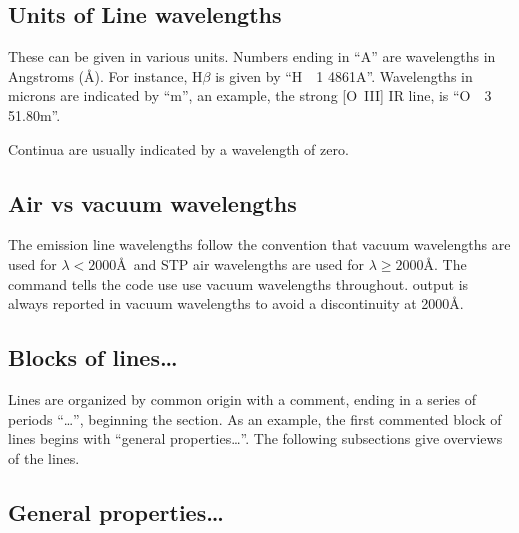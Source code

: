 \subsection{Units of Line wavelengths}
These can be given in various units.
Numbers ending
in ``A'' are wavelengths in Angstroms (\AA ).
For instance, H$\beta$ is given by ``H~~1  4861A''.
Wavelengths in microns are indicated by ``m'', an example,
the strong [O~III] IR line, is ``O~~3 51.80m''.

Continua are usually
indicated by a wavelength of zero.

\subsection{Air vs vacuum wavelengths}

The emission line wavelengths follow the convention that vacuum wavelengths
are used for $\lambda < 2000$\AA\ and STP air wavelengths are used
for $\lambda \ge 2000$\AA.
The  command tells the code use use vacuum wavelengths throughout.
 output is always reported in vacuum wavelengths to avoid 
a discontinuity at 2000\AA.

\subsection{Blocks of lines\dots}

Lines are organized by common origin with a comment, ending in a series
of periods ``\dots'', beginning the section.
As an example, the first
commented block of lines begins with ``general properties\dots''.
The
following subsections give overviews of the lines.

\subsection{General properties\dots}

